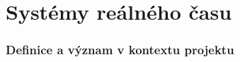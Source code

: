 \chapter{Systémy reálného času}

\subsection{Definice a význam v kontextu projektu}
\endinput

\endinput